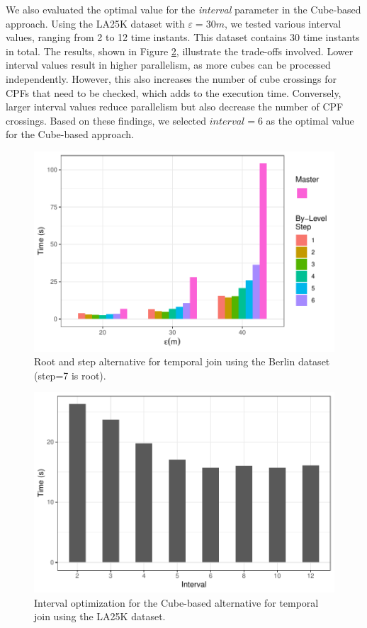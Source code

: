 We also evaluated the optimal value for the \textit{interval} parameter in the Cube-based approach. Using the LA25K dataset with $\varepsilon=30m$, we tested various interval values, ranging from 2 to 12 time instants. This dataset contains 30 time instants in total. The results, shown in Figure \ref{fig:interval_performance}, illustrate the trade-offs involved. Lower interval values result in higher parallelism, as more cubes can be processed independently. However, this also increases the number of cube crossings for CPFs that need to be checked, which adds to the execution time. Conversely, larger interval values reduce parallelism but also decrease the number of CPF crossings. Based on these findings, we selected $interval=6$ as the optimal value for the Cube-based approach.

\begin{figure}
    \centering
    \includegraphics[width=0.8\linewidth]{chapter4/figures/plots/06_step_performance/step_performance.pdf}
    \caption{Root and step alternative for temporal join using the Berlin dataset (step=7 is root).}\label{fig:step_performance}
\end{figure}

\begin{figure}
    \centering
    \includegraphics[width=0.8\linewidth]{chapter4/figures/plots/07_interval_performance/interval-performance.pdf}
    \caption{Interval optimization for the Cube-based alternative for temporal join using the LA25K dataset.}\label{fig:interval_performance}
\end{figure}

